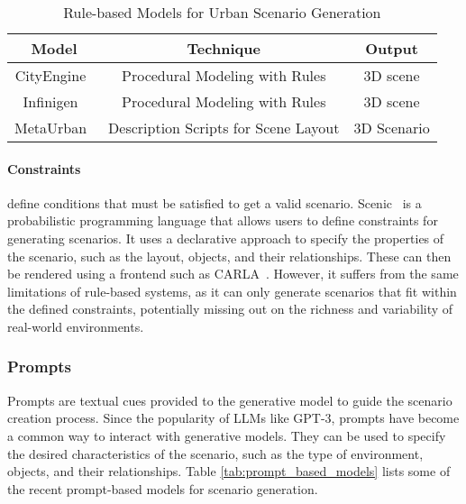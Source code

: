 \documentclass{article}
\begin{document}
\begin{table}[ht]
\centering
    \begin{tabular}{|c|c|c|}
    \hline
    \textbf{Model} & \textbf{Technique} & \textbf{Output} \\ \hline
    CityEngine~\cite{parish2001procedural} & Procedural Modeling with Rules & 3D scene \\ \hline
    Infinigen~\cite{raistrick2023infinite} & Procedural Modeling with Rules & 3D scene \\ \hline
    MetaUrban~\cite{wu2024metaurban} & Description Scripts for Scene Layout & 3D Scenario \\ \hline    
    \end{tabular}
\caption{Rule-based Models for Urban Scenario Generation}
\label{tab:rule_based_models}
\end{table}

\paragraph{Constraints} define conditions that must be satisfied to get a valid scenario. Scenic~\cite{fremont2019scenic} is a probabilistic programming language that allows users to define constraints for generating scenarios. It uses a declarative approach to specify the properties of the scenario, such as the layout, objects, and their relationships. These can then be rendered using a frontend such as CARLA~\cite{dosovitskiy2017carla}. However, it suffers from the same limitations of rule-based systems, as it can only generate scenarios that fit within the defined constraints, potentially missing out on the richness and variability of real-world environments.

\subsubsection{Prompts}

Prompts are textual cues provided to the generative model to guide the scenario creation process. Since the popularity of LLMs like GPT-3, prompts have become a common way to interact with generative models. They can be used to specify the desired characteristics of the scenario, such as the type of environment, objects, and their relationships. Table \ref{tab:prompt_based_models} lists some of the recent prompt-based models for scenario generation.
\end{document}
